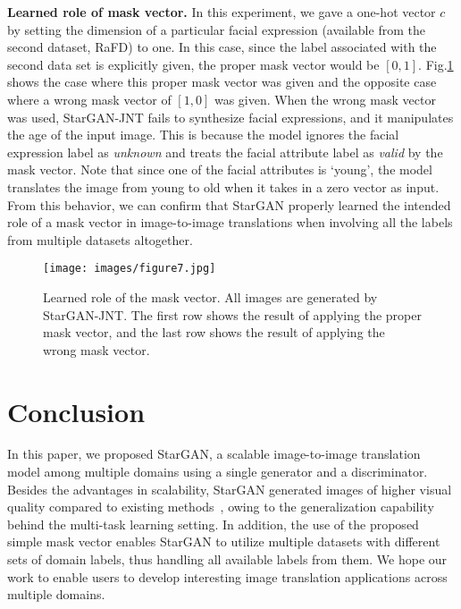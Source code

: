 \documentclass[10pt,twocolumn,letterpaper]{article}
\begin{document}
\smallskip

\noindent\textbf{Learned role of mask vector.} In this experiment, we gave a one-hot vector $c$ by setting the dimension of a particular facial expression (available from the second dataset, RaFD) to one. In this case, since the label associated with the second data set is explicitly given, the proper mask vector would be $[0,1]$. Fig.\thinspace\ref{figure7} shows the case where this proper mask vector was given and the opposite case where a wrong mask vector of $[1,0]$ was given. 
When the wrong mask vector was used, StarGAN-JNT fails to synthesize facial expressions, and it manipulates the age of the input image. This is because the model ignores the facial expression label as \textit{unknown} and treats the facial attribute label as \textit{valid} by the mask vector. Note that since one of the facial attributes is `young', the model translates the image from young to old when it takes in a zero vector as input. From this behavior, we can confirm that StarGAN properly learned the intended role of a mask vector in image-to-image translations when involving all the labels from multiple datasets altogether.

\begin{figure}[t]
\centering
\centerline{\texttt{[image: images/figure7.jpg]}}
\caption{Learned role of the mask vector. All images are generated by StarGAN-JNT. The first row shows the result of applying the proper mask vector, and the last row shows the result of applying the wrong mask vector.}
\label{figure7}
\vspace{-0.1in}
\end{figure}



\section{Conclusion} \label{conclusion}

In this paper, we proposed StarGAN, a scalable image-to-image translation model among multiple domains using a single generator and a discriminator. Besides the advantages in scalability, StarGAN generated images of higher visual quality compared to existing methods~\cite{li2016deep,perarnau2016invertible,zhu2017unpaired}, owing to the generalization capability behind the multi-task learning setting. In addition, the use of the proposed simple mask vector enables StarGAN to utilize multiple datasets with different sets of domain labels, thus handling all available labels from them. We hope our work to enable users to develop interesting image translation applications across multiple domains. 
\end{document}
